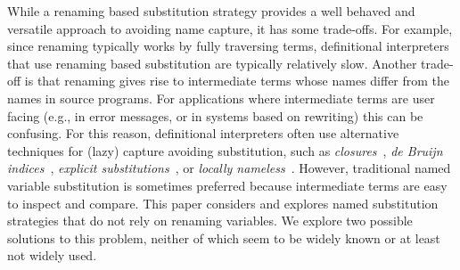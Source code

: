 While a renaming based substitution strategy provides a well behaved and versatile approach to avoiding name capture, it has some trade-offs.
For example, since renaming typically works by fully traversing terms, definitional interpreters that use renaming based substitution are typically relatively slow.
Another trade-off is that renaming gives rise to intermediate terms whose names differ from the names in source programs.
For applications where intermediate terms are user facing (e.g., in error messages, or in systems based on rewriting) this can be confusing.
For this reason, definitional interpreters often use alternative techniques for (lazy) capture avoiding substitution, such as \emph{closures}~\cite{Landin64}, \emph{de Bruijn indices}~\cite{de_Bruijn_1972}, \emph{explicit substitutions}~\cite{AbadiCCL91}, or \emph{locally nameless}~\cite{Chargueraud12}.
However, traditional named variable substitution is sometimes preferred because intermediate terms are easy to inspect and compare.
This paper considers and explores named substitution strategies that do not rely on renaming variables.
We explore two possible solutions to this problem, neither of which seem to be widely known or at least not widely used.




